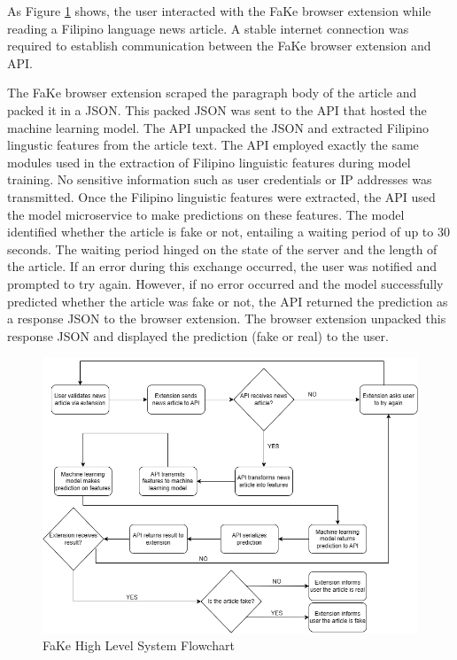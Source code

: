 As Figure \ref{SystemFlowchart} shows, the user interacted with the FaKe browser extension while reading a Filipino language news article. A stable internet connection was required to establish communication between the FaKe browser extension and API.

The FaKe browser extension scraped the paragraph body of the article and packed it in a JSON. This packed JSON was sent to the API that hosted the machine learning model. The API unpacked the JSON and extracted Filipino lingustic features from the article text. The API employed exactly the same modules used in the extraction of Filipino linguistic features during model training. No sensitive information such as user credentials or IP addresses was transmitted. Once the Filipino linguistic features were extracted, the API used the model microservice to make predictions on these features. The model identified whether the article is fake or not, entailing a waiting period of up to 30 seconds. The waiting period hinged on the state of the server and the length of the article. If an error during this exchange occurred, the user was notified and prompted to try again. However, if no error occurred and the model successfully predicted whether the article was fake or not, the API returned the prediction as a response JSON to the browser extension. The browser extension unpacked this response JSON and displayed the prediction (fake or real) to the user.

\begin{figure}[h]
\includegraphics[width=\textwidth,height=\textheight,keepaspectratio]{figures/FakeSystemFlowchart.png}
  \caption{FaKe High Level System Flowchart}
  \label{SystemFlowchart}
\end{figure}
\clearpage

